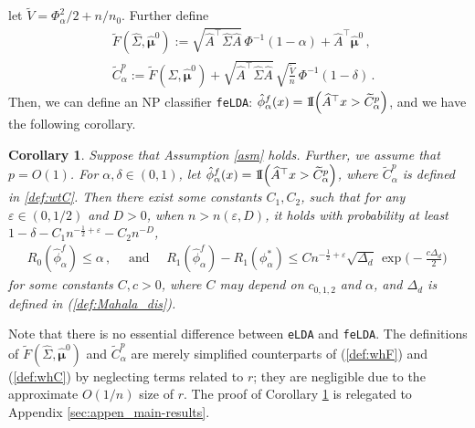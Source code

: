 \documentclass[12pt]{article}
\numberwithin{equation}{section}
\newtheorem{cor}{Corollary}
\theoremstyle{remark}
\newcommand{\1}{{\rm 1}\kern-0.24em{\rm I}}
\begin{document}
let $\widetilde{V} = {\Phi_\alpha^2}/{2}   +{n}/{n_0}$.
Further define 
 \begin{align}
&\widetilde{F}(\widehat\Sigma, \hat{\bm{\mu}}^0):= \sqrt{  \widehat A^{\top} \widehat\Sigma \widehat A} \, \Phi^{-1}(1-\alpha) +  \widehat{A} ^{\top} \hat{\bm{\mu}}^0 \,, \label{def:wtF}\\
&\widetilde C_\alpha^p:=\widetilde{F}(\widehat\Sigma, \hat{\bm{\mu}}^0) +\sqrt {\widehat A^{\top} \widehat\Sigma \widehat A} \, \sqrt{\frac{\widetilde{V}}{n}} \, \Phi^{-1}(1-\delta)\,. \label{def:wtC}
\end{align}
Then, we can define an NP classifier  \verb+feLDA+: $\hat{\phi}_\alpha^f(x)= \1 \Big( \widehat{A} ^{\top} x > \widetilde C_\alpha^p\Big)$, and  we have the following corollary. 


\begin{cor} \label{thm:prop}
Suppose that  Assumption \ref{asm} holds. Further, we assume that $p= O(1)$.  For $\alpha, \delta\in(0, 1)$, let $\hat{\phi}_\alpha^f(x)= \1 \Big( \widehat{A} ^{\top} x > \widetilde C_\alpha^p\Big)$, where $\widetilde C_\alpha^p$ is defined in \eqref{def:wtC}. Then there exist some constants $C_1, C_2$, such that for any $\varepsilon\in (0,1/2)$ and $D>0$, when $n>n(\varepsilon, D)$,  it holds with probability at least $1- \delta - C_1 n^{-\frac 12+ \varepsilon}-C_2 n^{-D} $,
\begin{align*}
R_0(\hat{\phi}_\alpha^f)\leq \alpha\,, \quad \text{ and }\quad  R_1(\hat{\phi}_\alpha^f) - R_1({\phi}_\alpha^*) \leq Cn^{-\frac12+ \varepsilon}
\sqrt{\varDelta_d} \, \exp\Big(- \frac{c\varDelta_d}{2}\Big)\,
\end{align*}
for some constants $C, c>0$, where $C$ may depend on $c_{0,1,2}$ and $\alpha$,  and $\varDelta_d$ is defined in (\ref{def:Mahala_dis}).
\end{cor}

Note that there is no essential difference between \verb+eLDA+ and \verb+feLDA+. The definitions of $\widetilde{F}(\widehat\Sigma, \hat{\bm{\mu}}^0)$ and $\widetilde C_\alpha^p$ are merely simplified counterparts of  (\ref{def:whF}) and (\ref{def:whC})  by neglecting terms related to $r$; they are negligible due to the approximate $O(1/n)$ size of $r$. The proof of Corollary \ref{thm:prop} is relegated to Appendix \ref{sec:appen_main-results}. 
\end{document}
